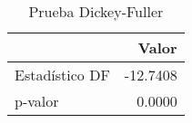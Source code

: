 \begin{table}[H]
\label{tab:dickey_fuller}
\centering
\begin{tabular}{lr}
\toprule
 & Valor \\
\midrule
Estad\'istico DF & -12.7408 \\
p-valor & 0.0000 \\
\bottomrule
\end{tabular}
\caption{Prueba Dickey-Fuller}
\end{table}
